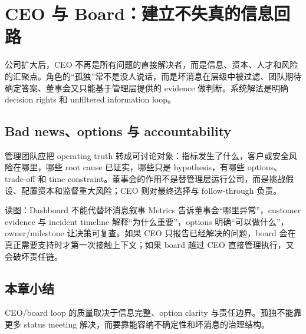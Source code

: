 \section{CEO 与 Board：建立不失真的信息回路}

公司扩大后，CEO 不再是所有问题的直接解决者，而是信息、资本、人才和风险的汇聚点。角色的“孤独”常不是没人说话，而是坏消息在层级中被过滤、团队期待确定答案、董事会又只能基于管理层提供的 evidence 做判断。系统解法是明确 decision rights 和 unfiltered information loop。

\subsection{Bad news、options 与 accountability}

管理团队应把 operating truth 转成可讨论对象：指标发生了什么，客户或安全风险在哪里，哪些 root cause 已证实，哪些只是 hypothesis，有哪些 options、trade-off 和 time constraint。董事会的作用不是替管理层运行公司，而是挑战假设、配置资本和监督重大风险；CEO 则对最终选择与 follow-through 负责。


\begin{knowledgebox}{读图：Dashboard 不能代替坏消息叙事}
Metrics 告诉董事会“哪里异常”，customer evidence 与 incident timeline 解释“为什么重要”，options 明确“可以做什么”，owner/milestone 让决策可复查。如果 CEO 只报告已经解决的问题，board 会在真正需要支持时才第一次接触上下文；如果 board 越过 CEO 直接管理执行，又会破坏责任链。
\end{knowledgebox}


\subsection{本章小结}

CEO/board loop 的质量取决于信息完整、option clarity 与责任边界。孤独不能靠更多 status meeting 解决，而要靠能容纳不确定性和坏消息的治理结构。

